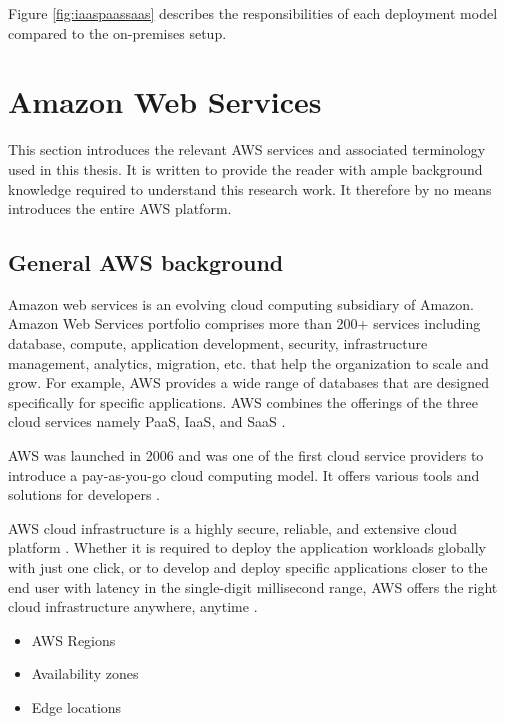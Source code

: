 \par Figure \ref{fig:iaaspaassaas} describes the responsibilities of each deployment model compared to the on-premises setup.

\section{Amazon Web Services}
\par This section introduces the relevant AWS services and associated terminology used in this thesis. It is written to provide the reader with ample background knowledge required to understand this research work. It therefore by no means introduces the entire AWS platform.

\subsection{General AWS background}

\par Amazon web services is an evolving cloud computing subsidiary of Amazon.
Amazon Web
Services portfolio comprises more than 200+ services including database, compute, application
development, security, infrastructure management, analytics, migration, etc.
that help the
organization to scale and grow.
For example, AWS provides a wide range of databases that are
designed specifically for specific applications.
AWS combines the offerings of the three cloud services 
namely PaaS, IaaS, and SaaS \cite{16}.

\par AWS was launched in 2006 and was one of the first cloud service providers to introduce a pay-as-you-go cloud computing model. It offers various tools and solutions for developers \cite{17}.
\\
\par AWS cloud infrastructure is a highly secure, reliable, and extensive cloud platform \cite{18}. Whether it is required to deploy the application workloads globally with just one click, or to develop and deploy specific applications closer to the end user with latency in the single-digit millisecond range, AWS offers the right cloud infrastructure anywhere, anytime \cite{19}.

\begin{itemize}
    \item AWS Regions
    \item Availability zones
    \item Edge locations
\end{itemize}

